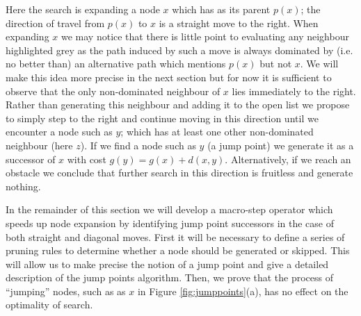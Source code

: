 Here the search is expanding a node $x$ which has as its parent $p(x)$;
the direction of travel from $p(x)$ to $x$ is a straight move to the right.
When expanding $x$ we may notice that there is little point to evaluating any
neighbour highlighted grey as the path induced by such a move is always
dominated by (i.e. no better than) an alternative path which mentions 
$p(x)$ but not $x$.
We will make this idea more precise in the next section but for now it is 
sufficient to observe that the only non-dominated neighbour of $x$ 
lies immediately to the right.
Rather than generating this neighbour and adding it to the open list we propose 
to simply step to the right and continue moving in this direction until we
encounter a node such as $y$; which has at least one other non-dominated
neighbour (here $z$). 
If we find a node such as $y$ (a jump point) we generate it as a successor 
of $x$ with cost $g(y) = g(x) + d(x, y)$.
Alternatively, if we reach an obstacle we conclude that further search in this
direction is fruitless and generate nothing.
\par
In the remainder of this section we will develop a macro-step operator which 
speeds up node expansion by identifying jump point successors in the case of
both straight and diagonal moves. First it will be necessary to define a series of
pruning rules to determine whether a node should be generated 
or skipped. 
This will allow us to make precise the notion of a jump point and 
give a detailed description of the jump points algorithm.
Then, we prove that the process of ``jumping'' nodes, such as as $x$ in 
Figure \ref{fig:jumppoints}(a), has no effect on the optimality of search.





